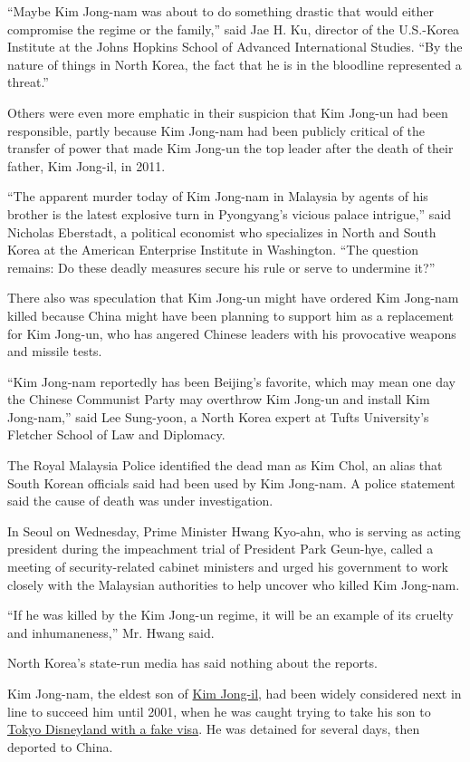 ``Maybe Kim Jong-nam was about to do something drastic that would either
compromise the regime or the family,'' said Jae H. Ku, director of the
U.S.-Korea Institute at the Johns Hopkins School of Advanced
International Studies. ``By the nature of things in North Korea, the
fact that he is in the bloodline represented a threat.''

Others were even more emphatic in their suspicion that Kim Jong-un had
been responsible, partly because Kim Jong-nam had been publicly critical
of the transfer of power that made Kim Jong-un the top leader after the
death of their father, Kim Jong-il, in 2011.

``The apparent murder today of Kim Jong-nam in Malaysia by agents of his
brother is the latest explosive turn in Pyongyang's vicious palace
intrigue,'' said Nicholas Eberstadt, a political economist who
specializes in North and South Korea at the American Enterprise
Institute in Washington. ``The question remains: Do these deadly
measures secure his rule or serve to undermine it?''

There also was speculation that Kim Jong-un might have ordered Kim
Jong-nam killed because China might have been planning to support him as
a replacement for Kim Jong-un, who has angered Chinese leaders with his
provocative weapons and missile tests.

``Kim Jong-nam reportedly has been Beijing's favorite, which may mean
one day the Chinese Communist Party may overthrow Kim Jong-un and
install Kim Jong-nam,'' said Lee Sung-yoon, a North Korea expert at
Tufts University's Fletcher School of Law and Diplomacy.

The Royal Malaysia Police identified the dead man as Kim Chol, an alias
that South Korean officials said had been used by Kim Jong-nam. A police
statement said the cause of death was under investigation.

In Seoul on Wednesday, Prime Minister Hwang Kyo-ahn, who is serving as
acting president during the impeachment trial of President Park
Geun-hye, called a meeting of security-related cabinet ministers and
urged his government to work closely with the Malaysian authorities to
help uncover who killed Kim Jong-nam.

``If he was killed by the Kim Jong-un regime, it will be an example of
its cruelty and inhumaneness,'' Mr. Hwang said.

North Korea's state-run media has said nothing about the reports.

Kim Jong-nam, the eldest son of
\href{http://www.nytimes3xbfgragh.onion/2011/12/19/world/asia/kim-jong-il-is-dead.html?pagewanted=all}{Kim
Jong-il}, had been widely considered next in line to succeed him until
2001, when he was caught trying to take his son to
\href{http://www.nytimes3xbfgragh.onion/2001/05/04/world/japan-deports-man-said-to-be-north-korean-leader-s-son.html}{Tokyo
Disneyland with a fake visa}. He was detained for several days, then
deported to China.

